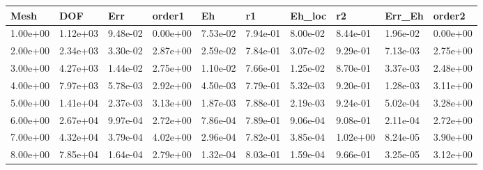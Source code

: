 \begin{tabular}{llllllllll}
Mesh & DOF & Err & order1 & Eh & r1 & Eh_loc & r2 & Err_Eh & order2 \\ 
\hline 
1.00e+00 & 1.12e+03 & 9.48e-02 & 0.00e+00 & 7.53e-02 & 7.94e-01 & 8.00e-02 & 8.44e-01 & 1.96e-02 & 0.00e+00 \\ 
2.00e+00 & 2.34e+03 & 3.30e-02 & 2.87e+00 & 2.59e-02 & 7.84e-01 & 3.07e-02 & 9.29e-01 & 7.13e-03 & 2.75e+00 \\ 
3.00e+00 & 4.27e+03 & 1.44e-02 & 2.75e+00 & 1.10e-02 & 7.66e-01 & 1.25e-02 & 8.70e-01 & 3.37e-03 & 2.48e+00 \\ 
4.00e+00 & 7.97e+03 & 5.78e-03 & 2.92e+00 & 4.50e-03 & 7.79e-01 & 5.32e-03 & 9.20e-01 & 1.28e-03 & 3.11e+00 \\ 
5.00e+00 & 1.41e+04 & 2.37e-03 & 3.13e+00 & 1.87e-03 & 7.88e-01 & 2.19e-03 & 9.24e-01 & 5.02e-04 & 3.28e+00 \\ 
6.00e+00 & 2.67e+04 & 9.97e-04 & 2.72e+00 & 7.86e-04 & 7.89e-01 & 9.06e-04 & 9.08e-01 & 2.11e-04 & 2.72e+00 \\ 
7.00e+00 & 4.32e+04 & 3.79e-04 & 4.02e+00 & 2.96e-04 & 7.82e-01 & 3.85e-04 & 1.02e+00 & 8.24e-05 & 3.90e+00 \\ 
8.00e+00 & 7.85e+04 & 1.64e-04 & 2.79e+00 & 1.32e-04 & 8.03e-01 & 1.59e-04 & 9.66e-01 & 3.25e-05 & 3.12e+00 \\ 
\hline 
\end{tabular}